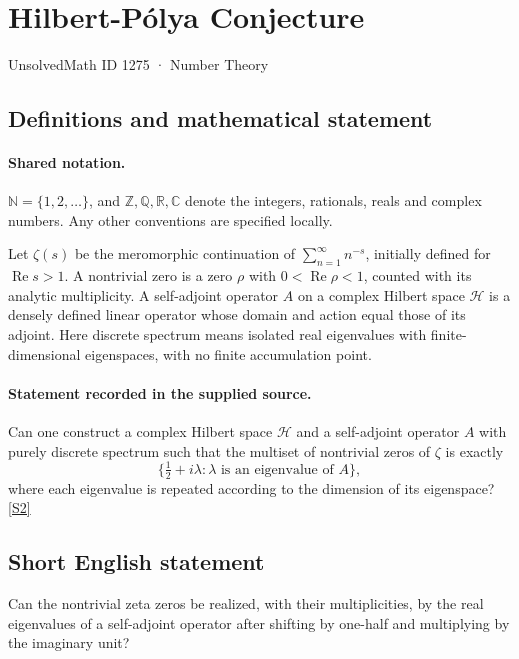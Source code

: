 \documentclass[11pt]{article}
\newcommand{\sref}[2]{\hyperlink{source:#1:#2}{[S#2]}}
\begin{document}
\setcounter{section}{1274}
\section{Hilbert-Pólya Conjecture}\label{1275}
{\small\sffamily UnsolvedMath ID 1275 · Number Theory}
\subsection{Definitions and mathematical statement}

\paragraph{Shared notation.}$\mathbb N=\{1,2,\ldots\}$, and $\mathbb Z,\mathbb Q,\mathbb R,\mathbb C$ denote the integers, rationals, reals and complex numbers. Any other conventions are specified locally.


Let $\zeta(s)$ be the meromorphic continuation of $\sum_{n=1}^{\infty}n^{-s}$, initially defined for $\operatorname{Re}s>1$. A nontrivial zero is a zero $\rho$ with $0<\operatorname{Re}\rho<1$, counted with its analytic multiplicity. A self-adjoint operator $A$ on a complex Hilbert space $\mathcal H$ is a densely defined linear operator whose domain and action equal those of its adjoint. Here discrete spectrum means isolated real eigenvalues with finite-dimensional eigenspaces, with no finite accumulation point.
\paragraph{Statement recorded in the supplied source.}
Can one construct a complex Hilbert space $\mathcal H$ and a self-adjoint operator $A$ with purely discrete spectrum such that the multiset of nontrivial zeros of $\zeta$ is exactly
\[
\{\tfrac12+i\lambda:\lambda\text{ is an eigenvalue of }A\},
\]
where each eigenvalue is repeated according to the dimension of its eigenspace? \sref{1275}{2}

\subsection{Short English statement}
Can the nontrivial zeta zeros be realized, with their multiplicities, by the real eigenvalues of a self-adjoint operator after shifting by one-half and multiplying by the imaginary unit?
\end{document}
